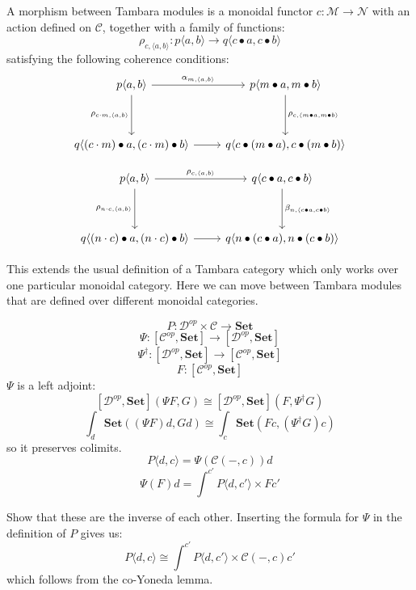\documentclass[11pt]{amsart}
\newcommand{\cat}[1]{\mathcal{#1}}%
\newcommand{\Cat}[1]{\mathbf{#1}}%
\newcommand{\Set}{\Cat{Set}}
\begin{document}
A morphism between Tambara modules is a monoidal functor $c \colon \cat M \to \cat N$ with an action defined on $\cat C$, together with a family of functions:
\[ \rho_{c, \langle a, b \rangle} \colon p \langle a, b \rangle \to q \langle c \bullet a, c \bullet b \rangle \]
satisfying the following coherence conditions:
\[
 \begin{tikzcd}
 p \langle a, b \rangle
 \arrow[r, "{\alpha_{m, \langle a, b \rangle}}"]
 \arrow[dd, "{\rho_{c \cdot m, \langle a, b \rangle}}"']
& p \langle m \bullet a, m \bullet b \rangle
 \arrow[dd, "{\rho_{c, \langle m \bullet a, m \bullet b \rangle}}"]
 \\
  \\
 q \langle (c \cdot m)  \bullet a, (c \cdot m) \bullet b \rangle
 \arrow[r, ""]
& q \langle c \bullet (m \bullet a), c \bullet (m \bullet b) \rangle
 \end{tikzcd}
\]

\[
 \begin{tikzcd}
 p \langle a, b \rangle
 \arrow[r, "{\rho_{c, \langle a, b \rangle}}"]
 \arrow[dd, "{\rho_{n \cdot c, \langle a, b \rangle}}"']
& q \langle c \bullet a, c \bullet b \rangle
 \arrow[dd, "{\beta_{n, \langle c \bullet a, c \bullet b \rangle}}"]
 \\
  \\
 q \langle (n \cdot c)  \bullet a, (n \cdot c) \bullet b \rangle
 \arrow[r, ""]
& q \langle n \bullet (c \bullet a), n \bullet (c \bullet b) \rangle
 \end{tikzcd}
\]

This extends the usual definition of a Tambara category which only works over one particular monoidal category. Here we can move between Tambara modules that are defined over different monoidal categories.


\[P \colon \cat D^{op} \times \cat C \to \Set \]
\[ \Psi \colon [\cat C^{op}, \Set] \to [\cat D^{op}, \Set] \]
\[ \Psi^{\dagger} \colon [\cat D^{op}, \Set] \to [\cat C^{op}, \Set] \]
\[ F \colon [\cat C^{op}, \Set] \]
$\Psi$ is a left adjoint:
\[ [\cat D^{op}, \Set] (\Psi F, G) \cong [\cat D^{op}, \Set](F, \Psi^{\dagger} G) \]
\[ \int_d  \Set ((\Psi F) d, G d) \cong  \int_c \Set (F c, (\Psi^{\dagger} G) c) \]
so it preserves colimits.
\[P \langle d, c \rangle = \Psi ( \cat C(-, c)) d \]
\[ \Psi (F) d = \int^{c'} P \langle d, c' \rangle \times F c' \]

Show that these are the inverse of each other. Inserting the formula for $\Psi$ in the definition of $P$ gives us:
\[ P \langle d, c \rangle \cong \int^{c'} P\langle d, c' \rangle  \times \cat C(-, c) c' \]
which follows from the co-Yoneda lemma.
\end{document}
